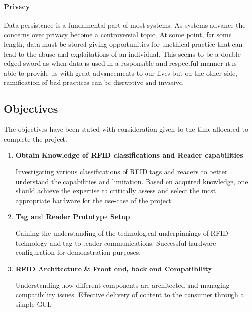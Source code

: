 \documentclass[a4paper, 11pt]{article}
\begin{document}
{\paragraph{Privacy}Data persistence is a fundamental part of most systems. As systems advance the concerns over privacy become a controversial topic. At some point, for some length, data must be stored giving opportunities for unethical practice that can lead to the abuse and exploitations of an individual. This seems to be a double edged sword as when data is used in a responsible and respectful manner it is able to provide us with great advancements to our lives but on the other side, ramification of bad practices can be disruptive and invasive.
\clearpage

\subsection{Objectives}
The objectives have been stated with consideration given to the time allocated to complete the project. 

\begin{enumerate}

   \item \textbf{Obtain Knowledge of RFID classifications and Reader capabilities}
   	\begin{flushleft}Investigating various classifications of RFID tags and readers to better understand the capabilities and limitation. Based on acquired knowledge, one should achieve the expertise to critically assess and select the most appropriate hardware for the use-case of the project.
  	\end{flushleft}
	
   \item \textbf{Tag and Reader Prototype Setup}
   	\begin{flushleft}Gaining the understanding of the technological underpinnings of RFID technology and tag to reader communications. Successful hardware configuration for demonstration purposes.
  	\end{flushleft}
  
   \item \textbf{RFID Architecture \&  Front end, back end Compatibility}
   	\begin{flushleft}Understanding how different components are architected and managing compatibility issues. Effective delivery of content to the consumer through a simple GUI.
  	\end{flushleft}
  

\end{enumerate}}
\end{document}
